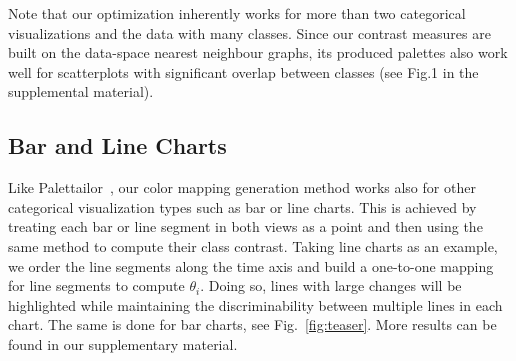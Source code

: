 Note that our optimization inherently works for more than two categorical visualizations and the data with many classes. Since our contrast measures are built on the data-space nearest neighbour graphs, its produced palettes also work well for scatterplots with significant overlap between classes (see Fig.1 in the supplemental material).





\subsection{Bar and Line Charts}
\label{subsec:ext}
Like Palettailor~\cite{Lu21}, our color mapping generation method works also for other categorical visualization types such as bar or line charts. This is achieved by treating each bar or line segment in both views as a point and then using the same method to compute their class contrast.
Taking line charts as an example,  we order the line segments along the time axis and build a one-to-one mapping for line segments to compute $\theta_i$.
Doing so, lines with large changes will be highlighted while maintaining the discriminability between multiple lines in each chart. The same is done for bar charts, see Fig.~\ref{fig:teaser}.
More results can be found in our supplementary material.

